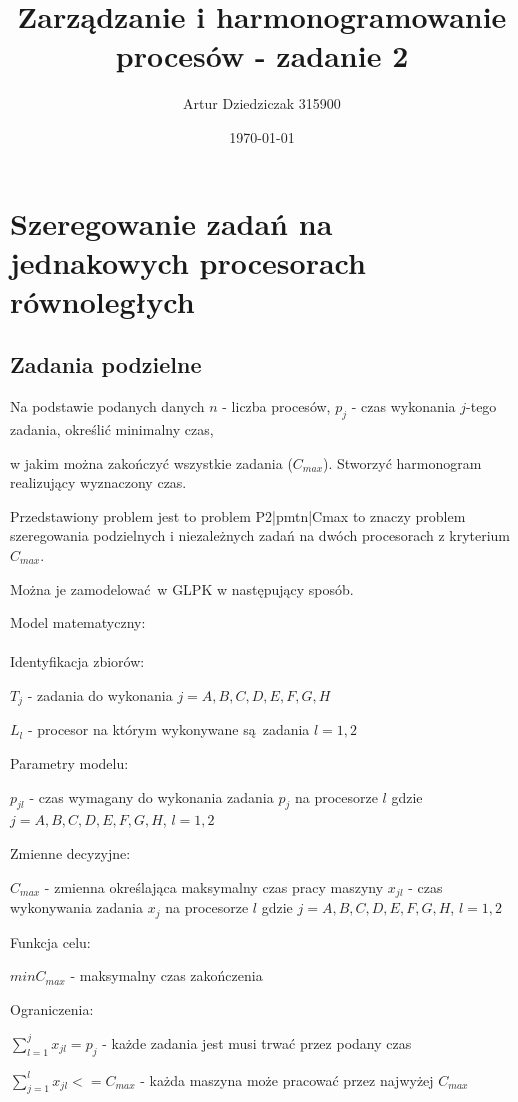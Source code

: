 \documentclass{article}
\title{Zarządzanie i harmonogramowanie procesów - zadanie 2}
\author{Artur Dziedziczak 315900}
\date{\today}
\begin{document}
\maketitle

\section {Szeregowanie zadań na jednakowych procesorach równoległych}
\subsection{Zadania podzielne}

Na podstawie podanych danych \(n\) - liczba procesów,
\(p_j\) - czas wykonania \(j\)-tego zadania, określić minimalny czas,

w jakim można zakończyć wszystkie zadania (\(C_{max}\)).
Stworzyć harmonogram realizujący wyznaczony czas.

Przedstawiony problem jest to problem P2|pmtn|Cmax to znaczy problem szeregowania podzielnych i niezależnych zadań na dwóch procesorach z kryterium $C_{max}$.

Można je zamodelować w GLPK w następujący sposób.

\noindent Model matematyczny: \\\\

\noindent Identyfikacja zbiorów:

$T_j$ - zadania do wykonania $j = {A,B,C,D,E,F,G,H}$

$L_{l}$ - procesor na którym wykonywane są zadania $l = {1,2}$

\noindent Parametry modelu:

$p_{jl}$ - czas wymagany do wykonania zadania $p_j$ na procesorze $l$ gdzie $j = {A,B,C,D,E,F,G,H}$, $l = {1,2}$

\noindent Zmienne decyzyjne:

$C_{max}$ - zmienna określająca maksymalny czas pracy maszyny
$x_{jl}$ - czas wykonywania zadania $x_j$ na procesorze $l$ gdzie $j = {A,B,C,D,E,F,G,H}$, $l = {1,2}$

\noindent Funkcja celu:

$min C_{max}$ - maksymalny czas zakończenia

\noindent Ograniczenia:

$\sum^{j}_{l = 1} x_{jl} = p_j$ - każde zadania jest musi trwać przez podany czas 

$\sum^{l}_{j = 1} x_{jl} <= C_{max}$ - każda maszyna może pracować przez najwyżej $C_{max}$
\end{document}
